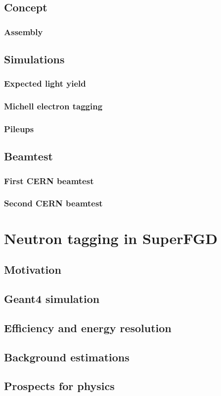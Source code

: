 \documentclass[../main.tex]{subfiles}
\begin{document}
\section{Concept}
\subsection{Assembly}
\section{Simulations}
\subsection{Expected light yield}
\subsection{Michell electron tagging}
\subsection{Pileups}
\section{Beamtest}
\subsection{First CERN beamtest}
\subsection{Second CERN beamtest}

\chapter{Neutron tagging in SuperFGD}
\label{ch:up:neutron}
\section{Motivation}
\section{Geant4 simulation}
\section{Efficiency and energy resolution}
\section{Background estimations}
\section{Prospects for physics}
\end{document}
